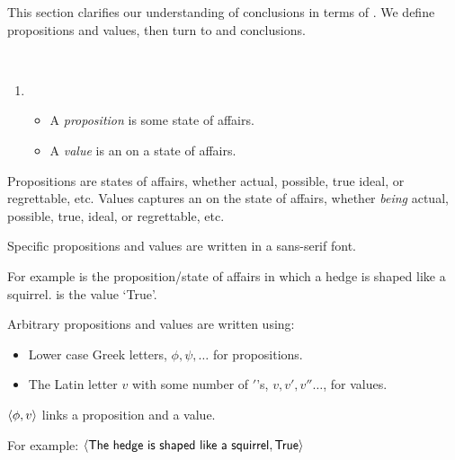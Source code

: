 \begin{note}
  This section clarifies our understanding of conclusions in terms of \evalN{}.
  We define propositions and values, then turn to  and conclusions.
\end{note}
%
\begin{note}
  \begin{definition}
    \label{def:prop-val}
    \mbox{ }%
    \vspace{-\baselineskip}
    \begin{enumerate}[noitemsep, label=]
    \item
      \begin{itemize}
      \item
        A \emph{proposition} is some state of affairs.
      \item
        A \emph{value} is an \agpe{} on a state of affairs.
      \end{itemize}
    \end{enumerate}
    \vspace{-\baselineskip}
  \end{definition}

  Propositions are states of affairs, whether actual, possible, true ideal, or regrettable, etc.
  Values captures an \agpe{} on the state of affairs, whether \emph{being} actual, possible, true, ideal, or regrettable, etc.

  \begin{notation}
    \item
      Specific propositions and values are written in a \textsf{sans-serif} font.

      For example  is the proposition/state of affairs in which a hedge is shaped like a squirrel.
       is the value `True'.
    \item
      Arbitrary propositions and values are written using:
      \begin{itemize}[noitemsep]
      \item
        Lower case Greek letters, \(\phi, \psi, \dots\) for propositions.
      \item
        The Latin letter \(v\) with some number of \('\)'s, \(v, v', v'' \dots\), for values.
      \end{itemize}
    \item
      \(\langle \phi, v \rangle\) links a proposition and a value.

      For example:
      \(\pv{\prop{The hedge is shaped like a squirrel}}{\val{True}}\)
    \end{notation}
\end{note}

